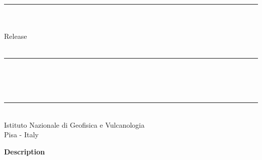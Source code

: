 
\thispagestyle{empty}

\vspace*{0.3in}

\begin{centering}
  \rule{6in}{0.04in}				\\	\vspace{0.25in}
  {\Huge \PDAC\ \UGTITLE}			\\	\vspace{0.25in}
  {\Large Release \RELEASEVERSION}          	\\	\vspace{0.20in}
  {\Large \PDACNOTES}                    	\\	\vspace{0.20in}
  \rule{6in}{0.04in}				\\	\vspace{0.25in}
  {\Large \UGAUTHORS}				\\	\vspace{0.20in}
  \PDACDATE					\\	\vspace{0.20in}
  \rule{6in}{0.04in}				\\	\vspace{0.25in}
  {\large       Istituto Nazionale di Geofisica e Vulcanologia} \\ 
  {\large       Pisa - Italy}      \\ 
\end{centering}
\vspace{0.2in}

\begin{center}
  {\Large \bf Description}
\end{center}

\noindent \UGDESC

